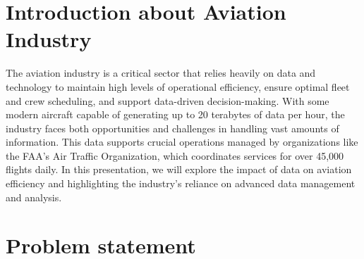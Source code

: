 \documentclass[12pt,a4paper]{article}
\begin{document}
\tableofcontents
\newpage


\section{Introduction about Aviation Industry}
The aviation industry is a critical sector that relies heavily on data and
technology to maintain high levels of operational efficiency, ensure optimal
fleet and crew scheduling, and support data-driven decision-making. With some
modern aircraft capable of generating up to 20 terabytes of data per hour, the
industry faces both opportunities and challenges in handling vast amounts of
information. This data supports crucial operations managed by organizations like
the FAA's Air Traffic Organization, which coordinates services for over 45,000
flights daily. In this presentation, we will explore the impact of data on
aviation efficiency and highlighting the industry's reliance on advanced data
management and analysis.

\section{Problem statement}
\end{document}
